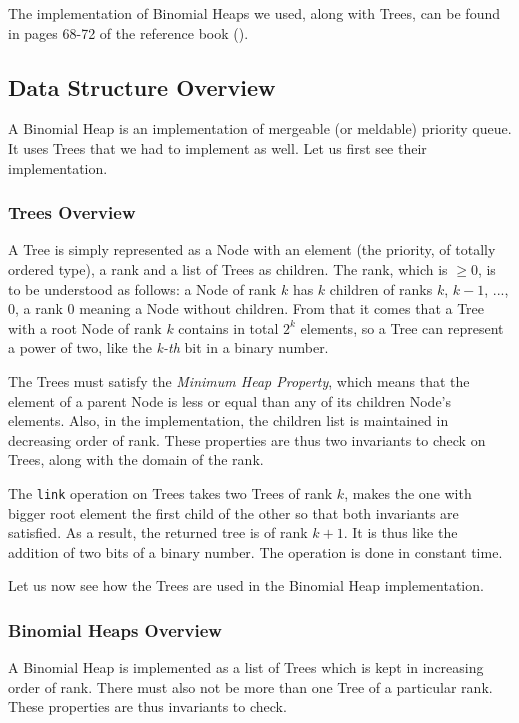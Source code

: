 The implementation of Binomial Heaps we used, 
along with Trees, 
can be found in pages 68-72 of the reference book (\cite{Okasaki}).

\subsection{Data Structure Overview}
A Binomial Heap is an implementation of mergeable (or meldable) priority queue.
It uses Trees that we had to implement as well.
Let us first see their implementation.

\subsubsection{Trees Overview}
A Tree is simply represented as a Node with an element 
(the priority, of totally ordered type), a rank and a list of Trees as children.
The rank, which is $\geq 0$, is to be understood as follows:
a Node of rank $k$ has $k$ children of ranks $k$, $k-1$, ..., $0$,
a rank $0$ meaning a Node without children.
From that it comes that a Tree with a root Node of rank $k$ 
contains in total $2^k$ elements,
so a Tree can represent a power of two, 
like the \emph{k-th} bit in a binary number.

The Trees must satisfy the \emph{Minimum Heap Property}, 
which means that the element of a parent Node 
is less or equal than any of its children Node's elements.
Also, in the implementation, the children list is maintained in decreasing order of rank.
These properties are thus two invariants to check on Trees,
along with the domain of the rank.

The \verb|link| operation on Trees takes two Trees of rank $k$, 
makes the one with bigger root element the first child of the other
so that both invariants are satisfied.
As a result, the returned tree is of rank $k+1$.
It is thus like the addition of two bits of a binary number.
The operation is done in constant time.

Let us now see how the Trees are used in the Binomial Heap implementation.

\subsubsection{Binomial Heaps Overview}
A Binomial Heap is implemented as a list of Trees
which is kept in increasing order of rank.
There must also not be more than one Tree of a particular rank.
These properties are thus invariants to check.
 
